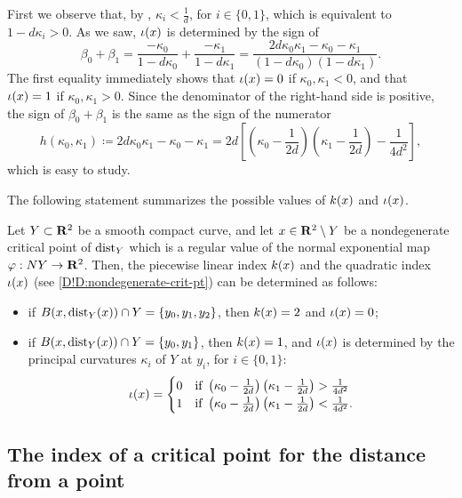 First we observe that, by \cite[]{Milnor1963}, $\kappa_i < \frac{1}{d}$, for $i\in \{0,1\}$, which is equivalent to $1-d \kappa_i >0$. 
As we saw, $\iota (x)$ is determined by the sign of
\begin{equation}
\label{D!eq:betakappa}
  \beta_0 + \beta_1 = \frac{-\kappa_0}{1-d \kappa_0} + \frac{-\kappa_1}{1-d \kappa_1} = \frac{2d \kappa_0 \kappa_1 - \kappa_0 - \kappa_1 }{(1-d \kappa_0)(1-d \kappa_1)}.
\end{equation}
The first equality immediately shows that $\iota (x)=0$ if $\kappa_0,\kappa_1 <0$, and that $\iota (x)=1$ if $\kappa_0,\kappa_1 >0$.
Since the denominator of the right-hand side is positive, the sign of $\beta_0 + \beta_1$ is the same as the sign of the numerator 
\[
  h(\kappa_0,\kappa_1) \coloneq 2d \kappa_0 \kappa_1 - \kappa_0 - \kappa_1 = 2d \left[ \left( \kappa_0 -\frac{1}{2d}\right)\left( \kappa_1 -\frac{1}{2d}\right) - \frac{1}{4d^2} \right],
\]
which is easy to study. 

The following statement summarizes the possible values of $k (x)$ and $\iota (x)$. 

\begin{corollary}\label{D!coro:indicesR2}
Let $Y\subset \mathbf{R}^2$ be a smooth compact curve, and let $x \in \mathbf{R}^2 \setminus Y$ be a nondegenerate critical point of $\operatorname{dist}_Y$ which is a regular value of the normal exponential map $\varphi: NY\to \mathbf{R}^2$. Then, the piecewise linear index $k(x)$ and the quadratic index $\iota(x)$ (see \cref{D!D:nondegenerate-crit-pt}) can be determined as follows:
\begin{itemize}
  \item [-] if $B(x,\operatorname{dist}_Y(x))\cap Y =\{y_0,y_1,y_2\}$, then $k(x)=2$ and $\iota(x)=0$;
  \item [-] if $B(x,\operatorname{dist}_Y(x))\cap Y =\{y_0,y_1\}$, then $k (x)=1$, and $\iota (x)$ is determined by the principal curvatures $\kappa_i$ of $Y$ at $y_i$, for $i\in \{0,1\}$:
  \[
    \iota (x) = \begin{cases}
      0 & \text{if } \left( \kappa_0 -\frac{1}{2d}\right)\left( \kappa_1 -\frac{1}{2d}\right) > \frac{1}{4d^2} \\
      1 & \text{if } \left( \kappa_0 -\frac{1}{2d}\right)\left( \kappa_1 -\frac{1}{2d}\right) < \frac{1}{4d^2} .
    \end{cases}
  \]
\end{itemize}
\end{corollary}

\subsection{The index of a critical point for the distance from a point}

